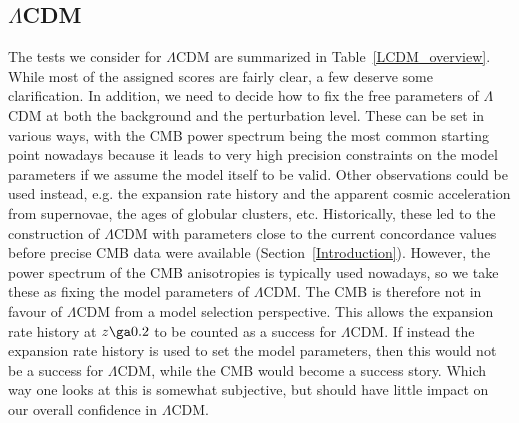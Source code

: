 \documentclass[fleqn,usenatbib,useAMS,onecolumn]{mnras} %
\begin{document}
\subsection{\texorpdfstring{$\Lambda$}{L}CDM}
\label{LCDM_comparison_section}

The tests we consider for $\Lambda$CDM are summarized in Table~\ref{LCDM_overview}. While most of the assigned scores are fairly clear, a few deserve some clarification. In addition, we need to decide how to fix the free parameters of $\Lambda$CDM at both the background and the perturbation level. These can be set in various ways, with the CMB power spectrum being the most common starting point nowadays because it leads to very high precision constraints on the model parameters if we assume the model itself to be valid. Other observations could be used instead, e.g. the expansion rate history and the apparent cosmic acceleration from supernovae, the ages of globular clusters, etc. Historically, these led to the construction of $\Lambda$CDM with parameters close to the current concordance values before precise CMB data were available (Section~\ref{Introduction}). However, the power spectrum of the CMB anisotropies is typically used nowadays, so we take these as fixing the model parameters of $\Lambda$CDM. The CMB is therefore not in favour of $\Lambda$CDM from a model selection perspective. This allows the expansion rate history at $z \ga 0.2$ to be counted as a success for $\Lambda$CDM. If instead the expansion rate history is used to set the model parameters, then this would not be a success for $\Lambda$CDM, while the CMB would become a success story. Which way one looks at this is somewhat subjective, but should have little impact on our overall confidence in $\Lambda$CDM.
\end{document}
